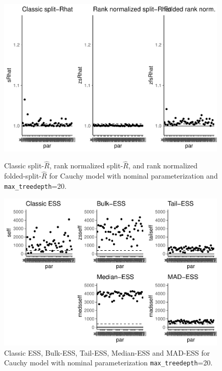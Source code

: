 \documentclass[american,]{article}
\begin{document}
\begin{figure}[tp]
  \centering
  \begin{minipage}{0.48\textwidth}
  \includegraphics[width=0.98\textwidth]{graphics/rhat-fit-nom-td20-1.pdf}
  \caption{Classic split-\(\widehat{R}\), rank normalized
    split-\(\widehat{R}\), and rank normalized
    folded-split-\(\widehat{R}\) for Cauchy model with nominal
    parameterization and \texttt{max\_treedepth}=20.}
  \label{fig:rhat-fit-nom-td20-1}
\end{minipage}
\hfill
  \begin{minipage}{0.48\textwidth}
  \includegraphics[width=0.98\textwidth]{graphics/ess-fit-nom-td20-1.pdf}
  \caption{Classic ESS, Bulk-ESS, Tail-ESS, Median-ESS and MAD-ESS for
    Cauchy model with nominal parameterization \texttt{max\_treedepth}=20.}
  \label{fig:ess-fit-nom-td20-1}
\end{minipage}
\end{figure}
\end{document}
